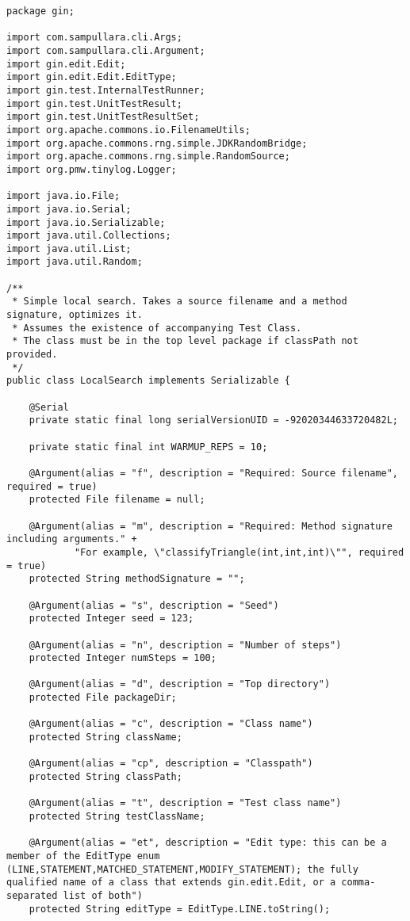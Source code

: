 \begin{lstlisting}
package gin;

import com.sampullara.cli.Args;
import com.sampullara.cli.Argument;
import gin.edit.Edit;
import gin.edit.Edit.EditType;
import gin.test.InternalTestRunner;
import gin.test.UnitTestResult;
import gin.test.UnitTestResultSet;
import org.apache.commons.io.FilenameUtils;
import org.apache.commons.rng.simple.JDKRandomBridge;
import org.apache.commons.rng.simple.RandomSource;
import org.pmw.tinylog.Logger;

import java.io.File;
import java.io.Serial;
import java.io.Serializable;
import java.util.Collections;
import java.util.List;
import java.util.Random;

/**
 * Simple local search. Takes a source filename and a method signature, optimizes it.
 * Assumes the existence of accompanying Test Class.
 * The class must be in the top level package if classPath not provided.
 */
public class LocalSearch implements Serializable {

    @Serial
    private static final long serialVersionUID = -92020344633720482L;

    private static final int WARMUP_REPS = 10;

    @Argument(alias = "f", description = "Required: Source filename", required = true)
    protected File filename = null;

    @Argument(alias = "m", description = "Required: Method signature including arguments." +
            "For example, \"classifyTriangle(int,int,int)\"", required = true)
    protected String methodSignature = "";

    @Argument(alias = "s", description = "Seed")
    protected Integer seed = 123;

    @Argument(alias = "n", description = "Number of steps")
    protected Integer numSteps = 100;

    @Argument(alias = "d", description = "Top directory")
    protected File packageDir;

    @Argument(alias = "c", description = "Class name")
    protected String className;

    @Argument(alias = "cp", description = "Classpath")
    protected String classPath;

    @Argument(alias = "t", description = "Test class name")
    protected String testClassName;

    @Argument(alias = "et", description = "Edit type: this can be a member of the EditType enum (LINE,STATEMENT,MATCHED_STATEMENT,MODIFY_STATEMENT); the fully qualified name of a class that extends gin.edit.Edit, or a comma-separated list of both")
    protected String editType = EditType.LINE.toString();


\end{lstlisting}
